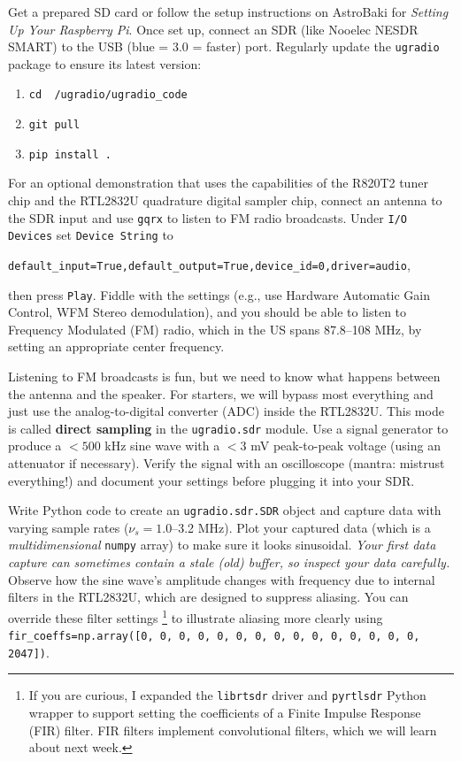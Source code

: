 \documentclass[11pt,preprint]{aastex}
\begin{document}
Get a prepared SD card or follow the setup instructions on AstroBaki for {\it Setting Up Your Raspberry Pi}. Once set up, connect an SDR (like Nooelec NESDR SMART) to the USB (blue = 3.0 = faster) port. Regularly update the {\tt ugradio} package to ensure its latest version:
\begin{enumerate}
    \item {\tt cd ~/ugradio/ugradio\_code}
    \item {\tt git pull}
    \item {\tt pip install .}
\end{enumerate}

For an optional demonstration that uses the capabilities of the R820T2 tuner chip and the RTL2832U quadrature digital sampler chip, connect an antenna to the SDR input and use {\tt gqrx} to listen to FM radio broadcasts. 
Under {\tt I/O Devices} set {\tt Device String} to 

\noindent
{\tt default\_input=True,default\_output=True,device\_id=0,driver=audio}, 

\noindent
then press {\tt Play}. 
Fiddle with the settings (e.g., use Hardware Automatic Gain Control, WFM Stereo demodulation), and
you should be able to listen to Frequency Modulated (FM) 
radio, which in the US spans 87.8--108 MHz, by setting an appropriate center frequency.

Listening to FM broadcasts is fun, but we need to know what happens between the antenna and the speaker.
For starters, we will bypass most everything and just use the analog-to-digital converter (ADC) inside the RTL2832U.
This mode is called {\bf direct sampling} in the {\tt ugradio.sdr} module.
Use a signal generator to produce a $<500$ kHz sine wave with a $<3$ mV peak-to-peak voltage (using an attenuator if necessary).
Verify the signal with an oscilloscope (mantra: mistrust everything!) and document your settings before plugging it into your SDR.

Write Python code to create an {\tt ugradio.sdr.SDR} object and capture data with varying sample rates ($\nu_s = 1.0$--3.2 MHz).
Plot your captured data (which is a {\it multidimensional} {\tt numpy} array) to make sure it looks sinusoidal.
{\it Your first data capture can sometimes contain a stale (old) buffer, so inspect your data carefully.}
Observe how the sine wave's amplitude changes with frequency due to internal filters in the RTL2832U, which are designed to suppress aliasing.
You can override these filter settings
\footnote{If you are curious, 
I expanded the {\tt librtsdr} driver and {\tt pyrtlsdr} Python wrapper
to support setting the coefficients of a Finite Impulse Response
(FIR) filter. FIR filters implement convolutional filters, which we will
learn about next week.}
to illustrate aliasing more clearly using
{\tt fir\_coeffs=np.array([0, 0, 0, 0, 0, 0, 0, 0, 0, 0, 0, 0, 0, 0, 0, 2047])}.
\end{document}
